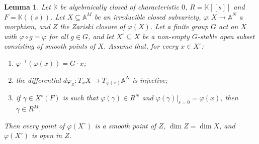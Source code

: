 \documentclass[11pt]{article}
\newtheorem{lemma}{Lemma}
\theoremstyle{definition}
\theoremstyle{remark}
\newcommand{\K}{\mathbb{K}}
\newcommand{\A}{\mathbb{A}}
\begin{document}
\begin{lemma}\label{lem:criterion}
Let $\K$ be algebraically closed of characteristic $0$, $R=\K[[s]]$ and $F=\K((s))$. Let $X\subseteq\A^M$ be an irreducible closed subvariety, $\varphi\colon X\to\A^N$ a morphism, and $Z$ the Zariski closure of $\varphi(X)$. Let a finite group $G$ act on $X$ with $\varphi\circ g=\varphi$ for all $g\in G$, and let $X^\circ\subseteq X$ be a non-empty $G$-stable open subset consisting of smooth points of $X$. Assume that, for every $x\in X^\circ$:
\begin{enumerate}[label=\textup{(\alph*)},nosep]
\item $\varphi^{-1}(\varphi(x))=G\cdot x$;
\item the differential $d\varphi_x\colon T_xX\to T_{\varphi(x)}\A^N$ is injective;
\item if $\gamma\in X^\circ(F)$ is such that $\varphi(\gamma)\in R^N$ and $\varphi(\gamma)|_{s=0}=\varphi(x)$, then $\gamma\in R^M$.
\end{enumerate}
Then every point of $\varphi(X^\circ)$ is a smooth point of $Z$, $\dim Z=\dim X$, and $\varphi(X^\circ)$ is open in $Z$.
\end{lemma}
\end{document}

